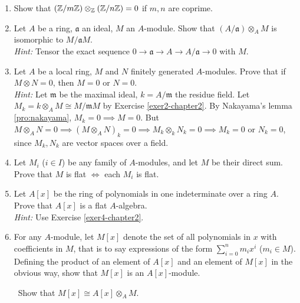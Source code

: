 
\begin{enumerate}
    \item Show that $(\mathbb{Z}/m\mathbb{Z}) \otimes_{\mathbb{Z}} (\mathbb{Z}/n\mathbb{Z}) = 0$ if $m, n$ are coprime.

    \item \label{exer2-chapter2}Let $A$ be a ring, $\mathfrak{a}$ an ideal, $M$ an $A$-module. Show that $(A/\mathfrak{a}) \otimes_A M$ is isomorphic to $M/\mathfrak{a}M$.\\
    \textit{Hint:} Tensor the exact sequence $0 \to \mathfrak{a} \to A \to A/\mathfrak{a} \to 0$ with $M$.

    \item \label{exer3-chapter2}Let $A$ be a local ring, $M$ and $N$ finitely generated $A$-modules. Prove that if $M \otimes N = 0$, then $M = 0$ or $N = 0$.\\
    \textit{Hint:} Let $\mathfrak{m}$ be the maximal ideal, $k = A/\mathfrak{m}$ the residue field. Let $M_k = k \otimes_A M \cong M/\mathfrak{m}M$ by Exercise \ref{exer2-chapter2}. By Nakayama's lemma \eqref{pro:nakayama}, $M_k = 0 \implies M = 0$. But $M \otimes_A N = 0 \implies (M \otimes_A N)_k = 0 \implies M_k \otimes_k N_k = 0 \implies M_k = 0$ or $N_k = 0$, since $M_k, N_k$ are vector spaces over a field.

    \item \label{exer4-chapter2}Let $M_i$ ($i \in I$) be any family of $A$-modules, and let $M$ be their direct sum. Prove that $M$ is flat $\iff$ each $M_i$ is flat.

    \item \label{exer5-chapter2}Let $A[x]$ be the ring of polynomials in one indeterminate over a ring $A$. Prove that $A[x]$ is a flat $A$-algebra.\\
    \textit{Hint:} Use Exercise \ref{exer4-chapter2}.

    \item \label{exer6-chapter2}For any $A$-module, let $M[x]$ denote the set of all polynomials in $x$ with coefficients in $M$, that is to say expressions of the form $\sum_{i=0}^n m_i x^i$ ($m_i \in M$). Defining the product of an element of $A[x]$ and an element of $M[x]$ in the obvious way, show that $M[x]$ is an $A[x]$-module. 
    
    \quad\, Show that $M[x] \cong A[x] \otimes_A M$.


\end{enumerate}
